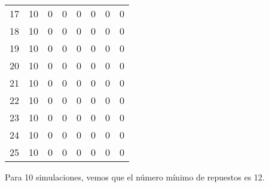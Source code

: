 \begin{table}[h]
{\begin{tabular}{|c|c|c|c|c|c|c|c|}
17 & 10 & 0 & 0 & 0 & 0 & 0 & 0 \\
18 & 10 & 0 & 0 & 0 & 0 & 0 & 0 \\
19 & 10 & 0 & 0 & 0 & 0 & 0 & 0 \\
20 & 10 & 0 & 0 & 0 & 0 & 0 & 0 \\
21 & 10 & 0 & 0 & 0 & 0 & 0 & 0 \\
22 & 10 & 0 & 0 & 0 & 0 & 0 & 0 \\
23 & 10 & 0 & 0 & 0 & 0 & 0 & 0 \\
24 & 10 & 0 & 0 & 0 & 0 & 0 & 0 \\
25 & 10 & 0 & 0 & 0 & 0 & 0 & 0 \\ \hline
\end{tabular}%
}
\end{table}

Para 10 simulaciones, vemos que el número mínimo de repuestos es 12.

